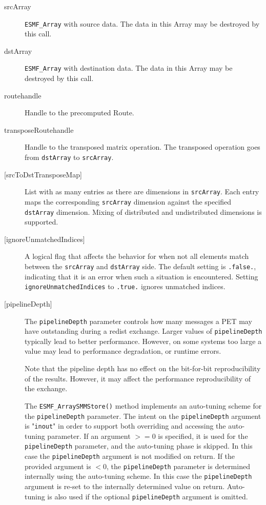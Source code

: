      \begin{description}
  
     \item [srcArray]
       {\tt ESMF\_Array} with source data. The data in this Array may be
       destroyed by this call.
  
     \item [dstArray]
       {\tt ESMF\_Array} with destination data. The data in this Array may be
       destroyed by this call.
  
     \item [routehandle]
       Handle to the precomputed Route.
  
     \item [transposeRoutehandle]
       Handle to the transposed matrix operation. The transposed operation goes
       from {\tt dstArray} to {\tt srcArray}.
  
     \item [{[srcToDstTransposeMap]}]
       List with as many entries as there are dimensions in {\tt srcArray}. Each
       entry maps the corresponding {\tt srcArray} dimension against the 
       specified {\tt dstArray} dimension. Mixing of distributed and
       undistributed dimensions is supported.
  
     \item [{[ignoreUnmatchedIndices]}]
       A logical flag that affects the behavior for when not all elements match
       between the {\tt srcArray} and {\tt dstArray} side. The default setting
       is {\tt .false.}, indicating that it is an error when such a situation is 
       encountered. Setting {\tt ignoreUnmatchedIndices} to {\tt .true.} ignores
       unmatched indices.
  
     \item [{[pipelineDepth]}]
       The {\tt pipelineDepth} parameter controls how many messages a PET
       may have outstanding during a redist exchange. Larger values
       of {\tt pipelineDepth} typically lead to better performance. However,
       on some systems too large a value may lead to performance degradation,
       or runtime errors.
  
       Note that the pipeline depth has no effect on the bit-for-bit
       reproducibility of the results. However, it may affect the performance
       reproducibility of the exchange.
  
       The {\tt ESMF\_ArraySMMStore()} method implements an auto-tuning scheme
       for the {\tt pipelineDepth} parameter. The intent on the 
       {\tt pipelineDepth} argument is "{\tt inout}" in order to 
       support both overriding and accessing the auto-tuning parameter.
       If an argument $>= 0$ is specified, it is used for the 
       {\tt pipelineDepth} parameter, and the auto-tuning phase is skipped.
       In this case the {\tt pipelineDepth} argument is not modified on
       return. If the provided argument is $< 0$, the {\tt pipelineDepth}
       parameter is determined internally using the auto-tuning scheme. In this
       case the {\tt pipelineDepth} argument is re-set to the internally
       determined value on return. Auto-tuning is also used if the optional 
       {\tt pipelineDepth} argument is omitted.
  

\end{description}
